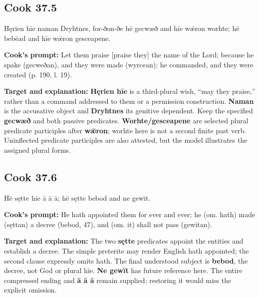 \par\begin{minipage}{\linewidth}\raggedright
\subsection*{Cook 37.5}

Hęrien hīe naman Dryhtnes, for-ðon-ðe hē gecwæð and hīe wǣron worhte; hē bebēad and hīe wǣron gesceapene.

\textbf{Cook's prompt:} Let them praise [praise they] the name of the Lord; because he spake (gecweðan), and they were made (wyrcean); he commanded, and they were created (p. 190, l. 19).

\textbf{Target and explanation:} \textbf{Hęrien hīe} is a third-plural wish, “may they praise,” rather than a command addressed to them or a permission construction. \textbf{Naman} is the accusative object and \textbf{Dryhtnes} its genitive dependent. Keep the specified \textbf{gecwæð} and both passive predicates. \textbf{Worhte/\allowbreak{}gesceapene} are selected plural predicate participles after \textbf{wǣron}; worhte here is not a second finite past verb. Uninflected predicate participles are also attested, but the model illustrates the assigned plural forms.

\end{minipage}\par\addvspace{4pt}

\par\begin{minipage}{\linewidth}\raggedright
\subsection*{Cook 37.6}

Hē sętte hīe ā ā ā; hē sętte bebod and ne gewīt.

\textbf{Cook's prompt:} He hath appointed them for ever and ever; he (om. hath) made (sęttan) a decree (bebod, 47), and (om. it) shall not pass (gewītan).

\textbf{Target and explanation:} The two \textbf{sętte} predicates appoint the entities and establish a decree. The simple preterite may render English hath appointed; the second clause expressly omits hath. The final understood subject is \textbf{bebod}, the decree, not God or plural hīe. \textbf{Ne gewīt} has future reference here. The entire compressed ending and \textbf{ā ā ā} remain supplied; restoring it would miss the explicit omission.

\end{minipage}\par\addvspace{4pt}

